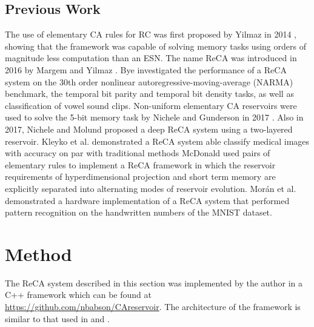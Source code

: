 \documentclass{elsarticle}
\begin{document}
\begin{multicols}{2}
	\subsection{Previous Work}
	
	The use of elementary CA rules for RC was first proposed by Yilmaz in 2014 
	\cite{yilmaz2014reservoir}
	, showing that the framework was capable of 
	solving memory tasks using orders of magnitude less computation than an ESN.
	The name ReCA was introduced in 2016 by Margem 
	and Yilmaz \cite{margem2017experimental}. Bye \cite{bye2016investigation} investigated the performance 
	of a ReCA system on the 30th order nonlinear autoregressive-moving-average 
	(NARMA) benchmark, the temporal bit parity and temporal bit density tasks, 
	as well as classification of vowel sound clips.  
	Non-uniform elementary CA reservoirs were used to solve the 5-bit memory 
	task by Nichele and Gunderson in 2017 \cite{nichele2017reservoir}. Also 
	in 2017, Nichele and Molund \cite{nichele2017deep}
	proposed a deep ReCA system using a 
	two-layered reservoir. Kleyko et al. \cite{kleyko2017modality} 
	demonstrated a ReCA system able classify medical images with accuracy on par 
	with traditional methods McDonald \cite{mcdonald2017reservoir} used pairs 
	of elementary rules to implement a ReCA framework in which the reservoir 
	requirements of hyperdimensional projection and short term memory are 
	explicitly separated into alternating modes of reservoir evolution.  
	Mor{\'a}n et al. \cite{moran2018reservoir}
	demonstrated a hardware implementation of a ReCA 
	system that performed pattern recognition on the handwritten numbers of the 
	MNIST dataset.
	
	
	
	
	
	
	\section{Method}\label{method}
	The ReCA system described in this section was implemented by the author in a 
	C++ framework which can be found at \url{https://github.com/nbabson/CAreservoir}. The 
	architecture of the framework is similar to that used in  
	\cite{nichele2017deep} and \cite{bye2016investigation}.
	

\end{multicols}
\end{document}
